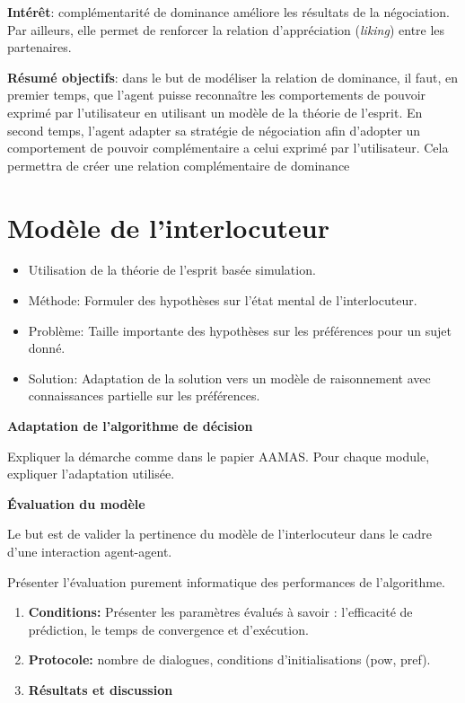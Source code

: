 \documentclass [french]{article}
\begin{document}
	\textbf{Intérêt}: complémentarité de dominance améliore les résultats de la négociation. Par ailleurs, elle permet de renforcer la relation d'appréciation (\emph{liking}) entre les partenaires.  
	
	\textbf{Résumé objectifs}: dans le but de modéliser la relation de dominance, il faut, en premier temps, que l'agent puisse reconnaître les comportements de pouvoir exprimé par l'utilisateur en utilisant un modèle de la théorie de l'esprit. En second temps, l'agent adapter sa stratégie de négociation afin d'adopter un comportement de pouvoir complémentaire a celui exprimé par l'utilisateur. Cela permettra de créer une relation complémentaire de dominance 
	
	\section{Modèle de l'interlocuteur}
		\begin{itemize}
			\item Utilisation de la théorie de l'esprit basée simulation. 
			\item Méthode: Formuler des hypothèses sur l'état mental de l'interlocuteur.
			\item Problème: Taille importante des hypothèses sur les préférences pour un sujet donné. 
			\item Solution: Adaptation de la solution vers un modèle de raisonnement avec connaissances partielle sur les préférences. 
		\end{itemize}
		
		\textbf{Adaptation de l'algorithme de décision}
		
			\par Expliquer la démarche comme dans le papier AAMAS. Pour chaque module, expliquer l'adaptation utilisée.
			
		\textbf{Évaluation du modèle}
		
			Le but est de valider la pertinence du modèle de l'interlocuteur dans le cadre d'une interaction agent-agent. 
			\par Présenter l'évaluation purement informatique des performances de l'algorithme.
			\begin{enumerate}
					\item \textbf{Conditions:} Présenter les paramètres évalués à savoir : l'efficacité de prédiction, le temps de convergence et d'exécution.
					\item \textbf{Protocole:} nombre de dialogues, conditions d'initialisations (pow, pref).
					\item \textbf{Résultats et discussion}
			\end{enumerate}
	
\end{document}
